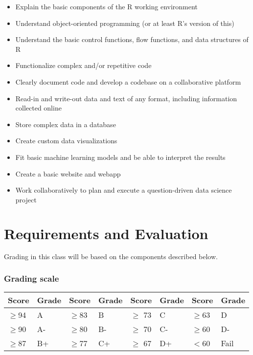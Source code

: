 \documentclass[11pt]{article}
\begin{document}
\begin{itemize}
\setlength\itemsep{0em}
\item Explain the basic components of the R working environment
\item Understand object-oriented programming (or at least R's version
  of this)
\item Understand the basic control functions, flow functions, and data
  structures of R
\item Functionalize complex and/or repetitive code
\item Clearly document code and develop a codebase on a collaborative platform
\item Read-in and write-out data and text of any format, including
  information collected online
\item Store complex data in a database
\item Create custom data visualizations
\item Fit basic machine learning models and be able to interpret the results
\item Create a basic website and webapp
\item Work collaboratively to plan and execute a question-driven data science project
\end{itemize}


\section*{Requirements and Evaluation}

Grading in this class will be based on the components described
below. 

\subsubsection*{Grading scale}
\vspace{2mm}

\begin{center}
\begin{tabular}{| l l | l l | l l | l l |}
\hline
Score & Grade & Score & Grade & Score & Grade& Score & Grade \\
\hline
$\ge$94 & A  & $\ge$83 & B & $\ge$ 73 &  C &$\ge$63 & D   \\
$\ge$90 & A-  & $\ge$80 & B- & $\ge$ 70 &  C- &$\ge$60 & D- \\
$\ge$87 & B+ & $\ge$77 & C+ & $\ge$ 67 &  D+& $<$60 & Fail \\
\hline

\end{tabular}
\end{center}
\end{document}
